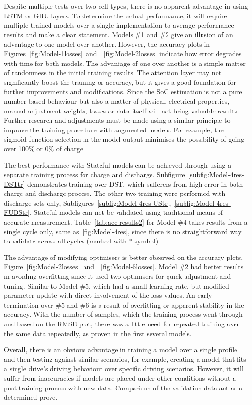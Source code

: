 %
%
Despite multiple tests over two cell types, there is no apparent advantage in using LSTM or GRU layers.
To determine the actual performance, it will require multiple trained models over a single implementation to average performance results and make a clear statement.
Models \#1 and \#2 give an illusion of an advantage to one model over another.
However, the accuracy plots in \mbox{Figures~\ref{fig:Model-1losses} and ~\ref{fig:Model-2losses}} indicate how error degrades with time for both models.
The advantage of one over another is a simple matter of randomness in the initial training results.
The attention layer may not significantly boost the training or accuracy, but it gives a good foundation for further improvements and modifications.
Since the SoC estimation is not a pure number based behaviour but also a matter of physical, electrical properties, manual adjustment weights, losses or data itself will not bring valuable results.
Further research and adjustments must be made using a similar principle to improve the training procedure with augmented models. 
For example, the sigmoid function selection in the model output minimises the possibility of going over 100\% or 0\% of charge.

%
%
The best performance with Stateful models can be achieved through using a separate training process for charge and discharge. 
\mbox{Subfigure~\ref{subfig:Model-4res-DSTtr}} demonstrates training over DST, which sufferers from high error in both charge and discharge process.
The other two training were performed with discharge sets only, \mbox{Subfigures~\ref{subfig:Model-4res-UStr}, \ref{subfig:Model-4res-FUDStr}}.
Stateful models can not be validated using traditional means of accurate measurement.
\mbox{Table~\ref{tab:acc-results2}} for Model \#4 takes results from a single cycle only, same as~\ref{fig:Model-4res}, since there is no straightforward way to validate across all cycles (marked with $*$ symbol).

%
%
The advantage of modifying optimisers is better observed on the accuracy plots, \mbox{Figure~\ref{fig:Model-2losses} and ~\ref{fig:Model-5losses}}.
Model \#2 had better results in avoiding overfitting since it used two optimisers for quick adjustment and tuning.
Similar to Model \#5, which had a small learning rate, but modified parameter update with direct involvement of the loss values.
An early termination over \#5 and \#6 is a result of overfitting or apparent stability in the accuracy.
With the number of samples, which the training process went through and based on the RMSE plot, there was a little need for repeated training over the same data repeatedly, as proven in the first several models.

%
%
Overall, there is an obvious advantage in training a model over a single profile and then testing against similar scenarios, for example, creating a model that fits a single drive's driving behaviour over specific driving scenarios.
However, it will suffer from inaccuracies if models are placed under other conditions without a post-training process with new data.
Comparison of the validation data act as a determined prove.
